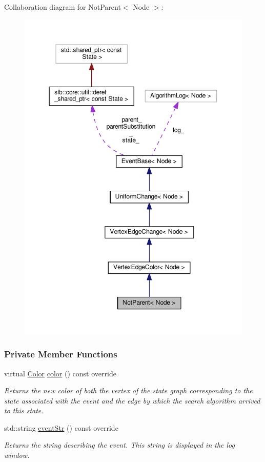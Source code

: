 Collaboration diagram for Not\+Parent$<$ Node $>$\+:\nopagebreak
\begin{figure}[H]
\begin{center}
\leavevmode
\includegraphics[width=350pt]{structNotParent__coll__graph}
\end{center}
\end{figure}
\subsubsection*{Private Member Functions}
\begin{DoxyCompactItemize}
\item 
virtual \hyperlink{colors_8h_ab87bacfdad76e61b9412d7124be44c1c}{Color} \hyperlink{structNotParent_a7d049b71da86e8f14a8ec644cd29dcd5}{color} () const override
\begin{DoxyCompactList}\small\item\em Returns the new color of both the vertex of the state graph corresponding to the state associated with the event and the edge by which the search algorithm arrived to this state. \end{DoxyCompactList}\item 
std\+::string \hyperlink{structNotParent_a38aa92423c44cb9e731e2a8991913cfa}{event\+Str} () const override
\begin{DoxyCompactList}\small\item\em Returns the string describing the event. This string is displayed in the log window. \end{DoxyCompactList}\end{DoxyCompactItemize}
